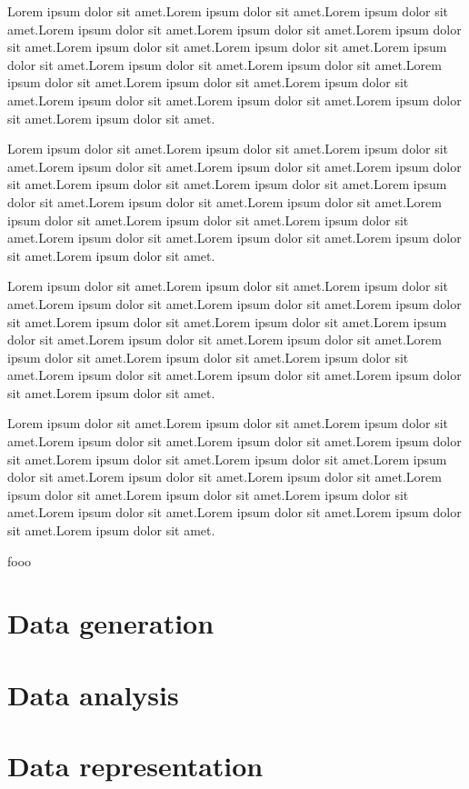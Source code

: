 \documentclass[main.tex]{subfiles}
\begin{document}
Lorem ipsum dolor sit amet.Lorem ipsum dolor sit amet.Lorem ipsum dolor sit amet.Lorem ipsum dolor sit amet.Lorem ipsum dolor sit amet.Lorem ipsum dolor sit amet.Lorem ipsum dolor sit amet.Lorem ipsum dolor sit amet.Lorem ipsum dolor sit amet.Lorem ipsum dolor sit amet.Lorem ipsum dolor sit amet.Lorem ipsum dolor sit amet.Lorem ipsum dolor sit amet.Lorem ipsum dolor sit amet.Lorem ipsum dolor sit amet.Lorem ipsum dolor sit amet.Lorem ipsum dolor sit amet.Lorem ipsum dolor sit amet.

Lorem ipsum dolor sit amet.Lorem ipsum dolor sit amet.Lorem ipsum dolor sit amet.Lorem ipsum dolor sit amet.Lorem ipsum dolor sit amet.Lorem ipsum dolor sit amet.Lorem ipsum dolor sit amet.Lorem ipsum dolor sit amet.Lorem ipsum dolor sit amet.Lorem ipsum dolor sit amet.Lorem ipsum dolor sit amet.Lorem ipsum dolor sit amet.Lorem ipsum dolor sit amet.Lorem ipsum dolor sit amet.Lorem ipsum dolor sit amet.Lorem ipsum dolor sit amet.Lorem ipsum dolor sit amet.Lorem ipsum dolor sit amet.

Lorem ipsum dolor sit amet.Lorem ipsum dolor sit amet.Lorem ipsum dolor sit amet.Lorem ipsum dolor sit amet.Lorem ipsum dolor sit amet.Lorem ipsum dolor sit amet.Lorem ipsum dolor sit amet.Lorem ipsum dolor sit amet.Lorem ipsum dolor sit amet.Lorem ipsum dolor sit amet.Lorem ipsum dolor sit amet.Lorem ipsum dolor sit amet.Lorem ipsum dolor sit amet.Lorem ipsum dolor sit amet.Lorem ipsum dolor sit amet.Lorem ipsum dolor sit amet.Lorem ipsum dolor sit amet.Lorem ipsum dolor sit amet.

Lorem ipsum dolor sit amet.Lorem ipsum dolor sit amet.Lorem ipsum dolor sit amet.Lorem ipsum dolor sit amet.Lorem ipsum dolor sit amet.Lorem ipsum dolor sit amet.Lorem ipsum dolor sit amet.Lorem ipsum dolor sit amet.Lorem ipsum dolor sit amet.Lorem ipsum dolor sit amet.Lorem ipsum dolor sit amet.Lorem ipsum dolor sit amet.Lorem ipsum dolor sit amet.Lorem ipsum dolor sit amet.Lorem ipsum dolor sit amet.Lorem ipsum dolor sit amet.Lorem ipsum dolor sit amet.Lorem ipsum dolor sit amet.

fooo

\section{Data generation}
\section{Data analysis}
\section{Data representation}
\end{document}
